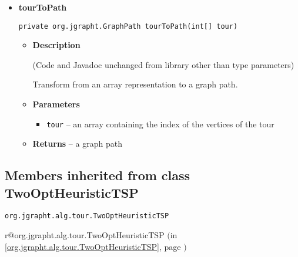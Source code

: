 \documentclass[11pt,a4paper]{report}
\makeatletter
\newcommand{\refdefined}[1]{
\expandafter\ifx\csname r@#1\endcsname\relax
\relax\else
{$($in \ref{#1}, page \pageref{#1}$)$}\fi}
\makeatother
\begin{document}
{{{{{{{{{{{{\begin{itemize}
{\begin{itemize}
{Transform from a path representation to an array representation.
}
\item{
{\bf  Parameters}
  \begin{itemize}
   \item{
\texttt{path} -- graph path}
  \end{itemize}
}%
\item{{\bf  Returns} -- 
an array containing the index of the vertices of the tour 
}%
\end{itemize}
}%
\item{ 
\hypertarget{uk.ac.ed.inf.aqmaps.flightplanning.EnhancedTwoOptTSP.tourToPath(int[])}{{\bf  tourToPath}\\}
\begin{lstlisting}[frame=none]
private org.jgrapht.GraphPath tourToPath(int[] tour)\end{lstlisting} %
\begin{itemize}
\item{
{\bf  Description}

(Code and Javadoc unchanged from library other than type parameters)

Transform from an array representation to a graph path.
}
\item{
{\bf  Parameters}
  \begin{itemize}
   \item{
\texttt{tour} -- an array containing the index of the vertices of the tour}
  \end{itemize}
}%
\item{{\bf  Returns} -- 
a graph path 
}%
\end{itemize}
}%
\end{itemize}
}
\subsection{Members inherited from class TwoOptHeuristicTSP }{
\texttt{org.jgrapht.alg.tour.TwoOptHeuristicTSP} {\small 
\refdefined{org.jgrapht.alg.tour.TwoOptHeuristicTSP}}
{\small 

}}}}}}}}}}}}}
\end{document}
